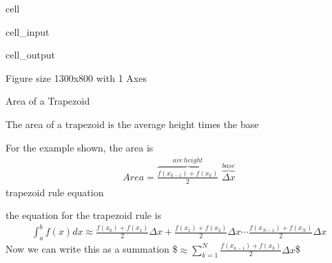 \documentclass[letterpaper,10pt,english]{jupyterBook}
\begin{document}
\begin{sphinxuseclass}{cell}\begin{sphinxVerbatimInput}

\begin{sphinxuseclass}{cell_input}
\begin{sphinxVerbatim}[commandchars=\\\{\}]
\end{sphinxVerbatim}

\end{sphinxuseclass}\end{sphinxVerbatimInput}
\begin{sphinxVerbatimOutput}

\begin{sphinxuseclass}{cell_output}
\begin{sphinxVerbatim}[commandchars=\\\{\}]
\PYGZlt{}Figure size 1300x800 with 1 Axes\PYGZgt{}
\end{sphinxVerbatim}

\end{sphinxuseclass}\end{sphinxVerbatimOutput}

\end{sphinxuseclass}
\sphinxAtStartPar
Area of a Trapezoid

\sphinxAtStartPar
The area of a trapezoid is the average height times the base



\sphinxAtStartPar
For the example shown, the area is
\begin{equation*}
\begin{split}
Area = \overbrace{\frac{f(x_{k-1}) + f(x_k)}{2}}^{ave \, height} \,\, \overbrace{\Delta x}^{base}
\end{split}
\end{equation*}
\sphinxAtStartPar
trapezoid rule equation

\sphinxAtStartPar
the equation for the trapezoid rule is
\begin{equation*}
\begin{split}
\int_a^b f(x)dx \approx \frac{f(x_0) + f(x_1)}{2}\Delta x + \frac{f(x_1) + f(x_2)}{2}\Delta x \cdots \frac{f(x_{N-1}) + f(x_N)}{2}\Delta x
\end{split}
\end{equation*}
\sphinxAtStartPar
Now we can write this as a summation
\$\(
\approx \sum_{k=1}^N \frac{f(x_{k-1}) + f(x_k)}{2} \Delta x
\)\$
\end{document}
